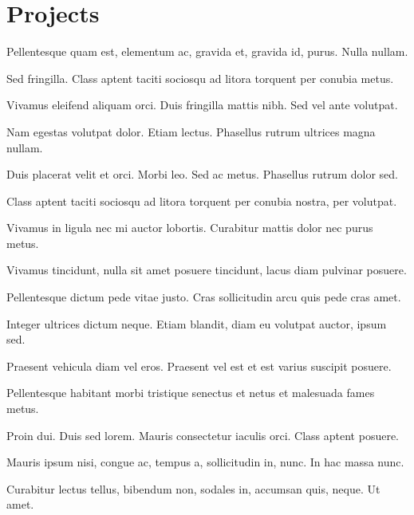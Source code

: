 \documentclass[letterpaper,10pt]{resume}
\begin{document}
    \section{Projects}
            \begin{items}
                \item Pellentesque quam est, elementum ac, gravida et, gravida id, purus. Nulla nullam.
                \item Sed fringilla. Class aptent taciti sociosqu ad litora torquent per conubia metus.
                \item Vivamus eleifend aliquam orci. Duis fringilla mattis nibh. Sed vel ante volutpat.
                \item Nam egestas volutpat dolor. Etiam lectus. Phasellus rutrum ultrices magna nullam.
                \item Duis placerat velit et orci. Morbi leo. Sed ac metus. Phasellus rutrum dolor sed.
                \item Class aptent taciti sociosqu ad litora torquent per conubia nostra, per volutpat.
            \end{items}
        \endplace
            \begin{items}
                \item Vivamus in ligula nec mi auctor lobortis. Curabitur mattis dolor nec purus metus.
                \item Vivamus tincidunt, nulla sit amet posuere tincidunt, lacus diam pulvinar posuere.
                \item Pellentesque dictum pede vitae justo. Cras sollicitudin arcu quis pede cras amet.
                \item Integer ultrices dictum neque. Etiam blandit, diam eu volutpat auctor, ipsum sed.
                \item Praesent vehicula diam vel eros. Praesent vel est et est varius suscipit posuere.
                \item Pellentesque habitant morbi tristique senectus et netus et malesuada fames metus.
                \item Proin dui. Duis sed lorem. Mauris consectetur iaculis orci. Class aptent posuere.
                \item Mauris ipsum nisi, congue ac, tempus a, sollicitudin in, nunc. In hac massa nunc.
                \item Curabitur lectus tellus, bibendum non, sodales in, accumsan quis, neque. Ut amet.
            \end{items}
\end{document}

